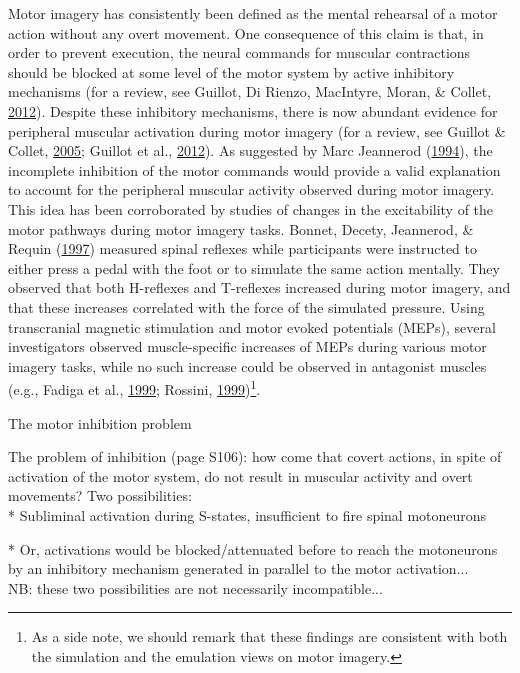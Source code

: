 \documentclass[a4paper,12pt,twoside,openright,oldfontcommands]{memoir}
\let\rmarkdownfootnote\footnote%
\def\footnote{\protect\rmarkdownfootnote}
\begin{document}
Motor imagery has consistently been defined as the mental rehearsal of a
motor action without any overt movement. One consequence of this claim
is that, in order to prevent execution, the neural commands for muscular
contractions should be blocked at some level of the motor system by
active inhibitory mechanisms (for a review, see Guillot, Di Rienzo,
MacIntyre, Moran, \& Collet,
\protect\hyperlink{ref-guillot_imagining_2012}{2012}). Despite these
inhibitory mechanisms, there is now abundant evidence for peripheral
muscular activation during motor imagery (for a review, see Guillot \&
Collet, \protect\hyperlink{ref-guillot_contribution_2005}{2005}; Guillot
et al., \protect\hyperlink{ref-guillot_imagining_2012}{2012}). As
suggested by Marc Jeannerod
(\protect\hyperlink{ref-jeannerod_representing_1994}{1994}), the
incomplete inhibition of the motor commands would provide a valid
explanation to account for the peripheral muscular activity observed
during motor imagery. This idea has been corroborated by studies of
changes in the excitability of the motor pathways during motor imagery
tasks. Bonnet, Decety, Jeannerod, \& Requin
(\protect\hyperlink{ref-bonnet_mental_1997}{1997}) measured spinal
reflexes while participants were instructed to either press a pedal with
the foot or to simulate the same action mentally. They observed that
both H-reflexes and T-reflexes increased during motor imagery, and that
these increases correlated with the force of the simulated pressure.
Using transcranial magnetic stimulation and motor evoked potentials
(MEPs), several investigators observed muscle-specific increases of MEPs
during various motor imagery tasks, while no such increase could be
observed in antagonist muscles (e.g., Fadiga et al.,
\protect\hyperlink{ref-fadiga_corticospinal_1999}{1999}; Rossini,
\protect\hyperlink{ref-rossini_corticospinal_1999}{1999})\footnote{As a
  side note, we should remark that these findings are consistent with
  both the simulation and the emulation views on motor imagery.}.

\vspace{2mm}

\begin{mybox}[label = inhibition]{The motor inhibition problem}

The problem of inhibition (page S106): how come that covert actions, in spite of activation of the motor system, do not result in muscular activity and overt movements? Two possibilities:\\

*   Subliminal activation during S-states, insufficient to fire spinal motoneurons

*   Or, activations would be blocked/attenuated before to reach the motoneurons by an inhibitory mechanism generated in parallel to the motor activation...\\

NB: these two possibilities are not necessarily incompatible...

\end{mybox}
\end{document}
